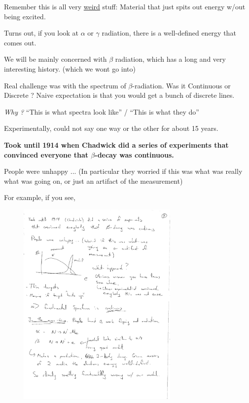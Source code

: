 {Remember this is all very \underline{weird} stuff: Material that just spits out energy w/out being excited.

Turns out, if you look at $\alpha$ or $\gamma$ radiation, there is a well-defined energy that comes out. 

We will be mainly concerned with $\beta$ radiation, which has a long and very interesting history. (which we wont go into) 

Real challenge was with the spectrum of $\beta$-radiation. 
Was it Continuous or Discrete ?
Naive expectation is that you would get a bunch of discrete lines.  

\textit{Why ?}  ``This is what spectra look like'' / ``This is what they do''

Experimentally, could not say one way or the other for about 15 years.

\textbf{Took until 1914 when Chadwick did a series of experiments that convinced everyone that $\beta$-decay was continuous.} 

People were unhappy ... (In particular they worried if this was what was really what was going on, or just an artifact of the measurement)

For example, if you see,

\begin{figure}[h!]
\centering
\includegraphics[width=0.7\textwidth]{./CountsVsE.pdf}
\end{figure}

}
